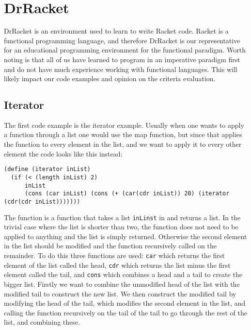 \section{DrRacket}
\label{sec:drracket}
DrRacket is an environment used to learn to write Racket code.
Racket is a functional programming language, and therefore DrRacket is our representative for an educational programming environment for the functional paradigm.
Worth noting is that all of us have learned to program in an imperative paradigm first and do not have much experience working with functional languages.
This will likely impact our code examples and opinion on the criteria evaluation.

\subsection{Iterator}
The first code example is the iterator example.
Usually when one wants to apply a function through a list one would use the map function, but since that applies the function to every element in the list, and we want to apply it to every other element the code looks like this instead:

\begin{lstlisting}[caption={The iterator function in DrRacket}, label={DrRacket_iterator}]
(define (iterator inList)
  (if (< (length inList) 2)
      inList
      (cons (car inList) (cons (+ (car(cdr inList)) 20) (iterator (cdr(cdr inList)))))))
\end{lstlisting}

The function is a function that takes a list \lstinline!inLinst! in and returns a list.
In the trivial case where the list is shorter than two, the function does not need to be applied to anything and the list is simply returned.
Otherwise the second element in the list should be modified and the function recursively called on the remainder.
To do this three functions are used:
\lstinline!car! which returns the first element of the list called the head, \lstinline!cdr! which returns the list minus the first element called the tail, and \lstinline!cons! which combines a head and a tail to create the bigger list.
Firstly we want to combine the unmodified head of the list with the modified tail to construct the new list.
We then construct the modified tail by modifying the head of the tail, which modifies the second element in the list, and calling the function recursively on the tail of the tail to go through the rest of the list, and combining these.

